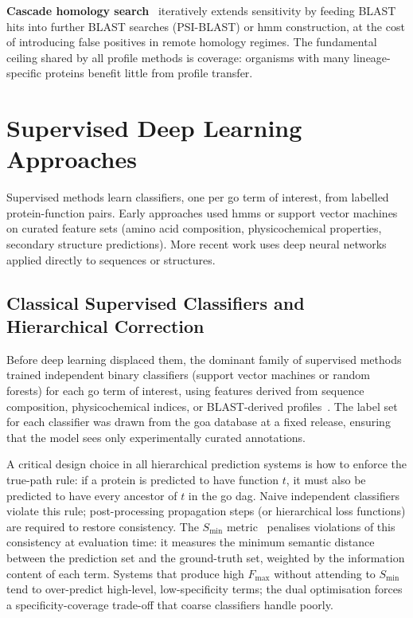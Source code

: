 \textbf{Cascade homology search}~\cite{park1998sequence} iteratively extends
sensitivity by feeding BLAST hits into further BLAST searches (PSI-BLAST) or
\gls{hmm} construction, at the cost of introducing false positives in remote
homology regimes. The fundamental ceiling shared by all profile methods is
coverage: organisms with many lineage-specific proteins benefit little from
profile transfer.

\section{Supervised Deep Learning Approaches}
\label{sec:related-ml}

Supervised methods learn classifiers, one per \gls{go} term of interest, from
labelled protein-function pairs. Early approaches used \glspl{hmm} or support
vector machines on curated feature sets (amino acid composition, physicochemical
properties, secondary structure predictions). More recent work uses deep neural
networks applied directly to sequences or structures.

\subsection{Classical Supervised Classifiers and Hierarchical Correction}
\label{subsec:related-classical-sup}

Before deep learning displaced them, the dominant family of supervised methods
trained independent binary classifiers (support vector machines or random forests)
for each \gls{go} term of interest, using features derived from sequence composition,
physicochemical indices, or BLAST-derived profiles~\cite{radivojac2013cafa1}. The
label set for each classifier was drawn from the \gls{goa} database at a fixed
release, ensuring that the model sees only experimentally curated annotations.

A critical design choice in all hierarchical prediction systems is how to enforce
the true-path rule: if a protein is predicted to have function $t$, it must also
be predicted to have every ancestor of $t$ in the \gls{go} \gls{dag}. Naive
independent classifiers violate this rule; post-processing propagation steps (or
hierarchical loss functions) are required to restore consistency. The $S_{\min}$
metric~\cite{jiang2016cafa2} penalises violations of this consistency at
evaluation time: it measures the minimum semantic distance between the
prediction set and the ground-truth set, weighted by the information content of
each term. Systems that produce high $F_{\max}$ without attending to $S_{\min}$
tend to over-predict high-level, low-specificity terms; the dual optimisation
forces a specificity-coverage trade-off that coarse classifiers handle poorly.

